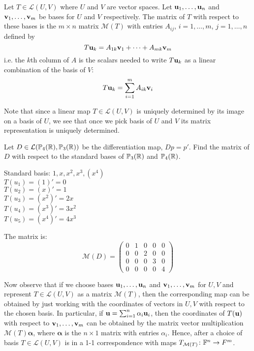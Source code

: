 \documentclass{article}
\begin{document}
\begin{definition}\label{def:matrix_rep}
Let $T \in \mathcal{L}(U,V)$ where $U$ and $V$ are vector spaces. Let ${\mathbf{u}}_1, \ldots, {\mathbf{u}}_n$ and ${\mathbf{v}}_1, \ldots, {\mathbf{v}}_m$ be bases for $U$ and $V$ respectively. The matrix of $T$ with respect to these bases is the $m \times n$ matrix $\mathcal{M}(T)$ with entries $A_{ij}$, $i = 1, \ldots, m$, $j = 1, \ldots, n$ defined by
\begin{equation*}
    T{\mathbf{u}}_k = A_{1k} {\mathbf{v}}_1 + \cdots + A_{mk} {\mathbf{v}}_m
\end{equation*}
i.e. the $k$th column of $A$ is the scalars needed to write $T {\mathbf{u}}_k$ as a linear combination of the basis of $V$:
\begin{equation*}
    T {\mathbf{u}}_k = \sum_{i=1}^m A_{ik} {\mathbf{v}}_i 
\end{equation*}
\end{definition}

Note that since a linear map $T\in \mathcal{L}(U,V)$ is uniquely determined by its image on a basis of $U$, we see that once we pick basis of $U$ and $V$ its matrix representation is uniquely determined. 

\begin{example}
Let $D \in \mathcal{L}(\mathbb{P}_4({\mathbb{R}}),\mathbb{P}_3({\mathbb{R}}))$ be the differentiation map, $Dp = p'$. Find the matrix of $D$ with respect to the standard bases of $\mathbb{P}_3({\mathbb{R}})$ and $\mathbb{P}_4({\mathbb{R}})$.

Standard basis: $1, x, x^2, x^3, (x^4)$ \\
$T(u_1) = (1)' = 0$ \\
$T(u_2) = (x)' = 1$ \\ 
$T(u_3) = (x^2)' = 2 x$ \\ 
$T(u_4) = (x^3)' = 3 x^2$ \\
$T(u_5) = (x^4)' = 4 x^3$

The matrix is:
\begin{equation*}
    \mathcal{M}(D) = \begin{pmatrix}
    0 & 1 & 0 & 0 & 0 \\
    0 & 0 & 2 & 0 & 0 \\
    0 & 0 & 0 & 3 & 0 \\
    0 & 0 & 0 & 0 & 4
     \end{pmatrix}
\end{equation*}
\end{example}

Now observe that if we choose bases ${\mathbf{u}}_1, \ldots, {\mathbf{u}}_n$ and ${\mathbf{v}}_1, \ldots, {\mathbf{v}}_m$ for $U,V$ and represent $T\in \mathcal{L}(U,V)$ as a matrix $\mathcal{M}(T)$, then the corresponding map can be obtained by just working with the coordinates of vectors in $U,V$ with respect to the chosen basis. In particular, if ${\mathbf{u}} = \sum_{i=1}^n \alpha_i {\mathbf{u}}_i$, then the coordinates of $T({\mathbf{u}})$ with respect to ${\mathbf{v}}_1, \ldots, {\mathbf{v}}_m$ can be obtained by the matrix vector multiplication $\mathcal{M}(T)\boldsymbol{\alpha}$, where $\boldsymbol{\alpha}$ is the $n\times 1$ matrix with entries $\alpha_i$. Hence, after a choice of basis $T\in \mathcal{L}(U,V)$ is in a 1-1 correspondence with maps $T_{\mathcal{M}(T)} \colon {\mathbb{F}}^n \to F^m$. 
\end{document}
